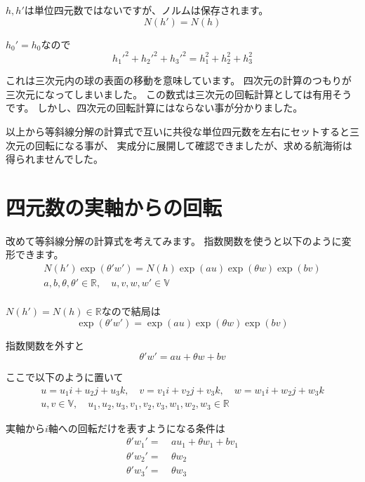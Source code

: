 \documentclass[a4paper,12pt,notitlepage]{jsreport}
\begin{document}
$h,h'$は単位四元数ではないですが、ノルムは保存されます。
\begin{equation}
  N(h')=N(h)
\end{equation}

$h_0'=h_0$なので
\begin{equation}
  h_1'^2+h_2'^2+h_3'^2=h_1^2+h_2^2+h_3^2
\end{equation}

これは三次元内の球の表面の移動を意味しています。
四次元の計算のつもりが三次元になってしまいました。
この数式は三次元の回転計算としては有用そうです。
しかし、四次元の回転計算にはならない事が分かりました。

以上から等斜線分解の計算式で互いに共役な単位四元数を左右にセットすると三次元の回転になる事が、
実成分に展開して確認できましたが、求める航海術は得られませんでした。

\section{四元数の実軸からの回転}

改めて等斜線分解の計算式を考えてみます。
指数関数を使うと以下のように変形できます。
\begin{equation}
  \begin{split}
    N(h')\exp(\theta'w')=N(h)\exp(au)\exp(\theta w)\exp(bv)\\
    a,b,\theta,\theta'\in\mathbb{R},\quad u,v,w,w'\in\mathbb{V}\\
  \end{split}
\end{equation}

$N(h')=N(h)\in\mathbb{R}$なので結局は
\begin{equation}
  \exp(\theta'w')=\exp(au)\exp(\theta w)\exp(bv)
\end{equation}

指数関数を外すと
\begin{equation}
  \theta'w'=au+\theta w+bv
\end{equation}

ここで以下のように置いて
\begin{equation}
  \begin{split}
    u=u_1i+u_2j+u_3k,\quad v=v_1i+v_2j+v_3k,\quad w=w_1i+w_2j+w_3k\\
    u,v\in\mathbb{V},\quad u_1,u_2,u_3,v_1,v_2,v_3,w_1,w_2,w_3\in\mathbb{R}
  \end{split}
\end{equation}

実軸から$i$軸への回転だけを表すようになる条件は
\begin{equation}
  \begin{split}
    \theta'w_1'=~&au_1+\theta w_1+bv_1\\
    \theta'w_2'=~&\theta w_2\\
    \theta'w_3'=~&\theta w_3\\
  \end{split}
\end{equation}
\end{document}
